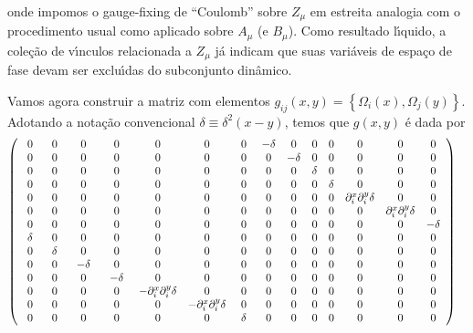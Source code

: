 \documentclass[a4paper,thmsa,12pt]{report}
\begin{document}
onde impomos o gauge-fixing de ``Coulomb'' sobre $Z_{\mu }$ em estreita
analogia com o procedimento usual como aplicado sobre $A_{\mu }$ (e $B_{\mu
} $). Como resultado l\'{\i}quido, a cole\c{c}\~{a}o de v\'{\i}nculos
relacionada a $Z_{\mu }$ j\'{a} indicam que suas vari\'{a}veis de espa\c{c}o
de fase devam ser exclu\'{\i}das do subconjunto din\^{a}mico.\bigskip

Vamos agora construir a matriz com elementos $g_{ij}(x,y)=\left\{ \Omega _{i}(x),\Omega
_{j}(y)\right\} $. Adotando a nota\c{c}\~{a}o convencional $\delta \equiv
\delta ^{2}\left( x-y\right) $, temos que $g(x,y)$ \'e dada por
\begin{eqnarray}
\left( 
\begin{array}{cccccccccccccc}
0 & 0 & 0 & 0 & 0 & 0 & 0 & -\delta & 0 & 0 & 0 & 0 & 0 & 0 \\ 
0 & 0 & 0 & 0 & 0 & 0 & 0 & 0 & -\delta & 0 & 0 & 0 & 0 & 0 \\ 
0 & 0 & 0 & 0 & 0 & 0 & 0 & 0 & 0 & \delta & 0 & 0 & 0 & 0 \\ 
0 & 0 & 0 & 0 & 0 & 0 & 0 & 0 & 0 & 0 & \delta & 0 & 0 & 0 \\ 
0 & 0 & 0 & 0 & 0 & 0 & 0 & 0 & 0 & 0 & 0 & \partial _{i}^{x}\partial
_{i}^{y}\delta & 0 & 0 \\ 
0 & 0 & 0 & 0 & 0 & 0 & 0 & 0 & 0 & 0 & 0 & 0 & \partial _{i}^{x}\partial
_{i}^{y}\delta & 0 \\ 
0 & 0 & 0 & 0 & 0 & 0 & 0 & 0 & 0 & 0 & 0 & 0 & 0 & -\delta \\ 
\hspace{0.05in}\delta \hspace{0.05in} & 0 & 0 & 0 & 0 & 0 & 0 & 0 & 0 & 0 & 0
& 0 & 0 & 0 \\ 
0 & \hspace{0.05in}\delta \hspace{0.05in} & 0 & 0 & 0 & 0 & 0 & 0 & 0 & 0 & 0
& 0 & 0 & 0 \\ 
0 & 0 & \hspace{0.05in}-\delta \hspace{0.05in} & 0 & 0 & 0 & 0 & 0 & 0 & 0 & 
0 & 0 & 0 & 0 \\ 
0 & 0 & 0 & \hspace{0.05in}-\delta \hspace{0.05in} & 0 & 0 & 0 & 0 & 0 & 0 & 
0 & 0 & 0 & 0 \\ 
0 & 0 & 0 & 0 & -\partial _{i}^{x}\partial _{i}^{y}\delta & 0 & 0 & 0 & 0 & 0
& 0 & 0 & 0 & 0 \\ 
0 & 0 & 0 & 0 & 0 & -\partial _{i}^{x}\partial _{i}^{y}\delta & 0 & 0 & 0 & 0
& 0 & 0 & 0 & 0 \\ 
0 & 0 & 0 & 0 & 0 & 0 & \hspace{0.05in}\delta \hspace{0.05in} & 0 & 0 & 0 & 0
& 0 & 0 & 0
\end{array}
\right) \nonumber  \label{358} \\
&& 
\end{eqnarray}
\end{document}
